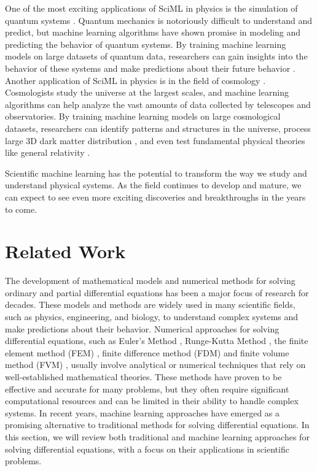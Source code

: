 One of the most exciting applications of SciML in physics is the simulation of quantum systems \cite{rupp2015machine,torlai2020machine}. Quantum mechanics is notoriously difficult to understand and predict, but machine learning algorithms have shown promise in modeling and predicting the behavior of quantum systems. By training machine learning models on large datasets of quantum data, researchers can gain insights into the behavior of these systems and make predictions about their future behavior \cite{mehta2019high}. Another application of SciML in physics is in the field of cosmology \cite{villaescusa2021camels,carleo2019machine,mathuriya2018cosmoflow}. Cosmologists study the universe at the largest scales, and machine learning algorithms can help analyze the vast amounts of data collected by telescopes and observatories. By training machine learning models on large cosmological datasets, researchers can identify patterns and structures in the universe, process large 3D dark matter distribution \cite{mathuriya2018cosmoflow}, and even test fundamental physical theories like general relativity \cite{alestas2022machine}.

Scientific machine learning has the potential to transform the way we study and understand physical systems. As the field continues to develop and mature, we can expect to see even more exciting discoveries and breakthroughs in the years to come.

\section{Related Work}
The development of mathematical models and numerical methods for solving ordinary and partial differential equations has been a major focus of research for decades. These models and methods are widely used in many scientific fields, such as physics, engineering, and biology, to understand complex systems and make predictions about their behavior. Numerical approaches for solving differential equations, such as Euler's Method \cite{euler1952methodus}, Runge-Kutta Method \cite{runge1895numerische}, the finite element method (FEM) \cite{herrmann1967finite}, finite difference method (FDM) \cite{richardson1911ix} and finite volume method (FVM) \cite{eymard2000finite}, usually involve analytical or numerical techniques that rely on well-established mathematical theories.
These methods have proven to be effective and accurate for many problems, but they often require significant computational resources and can be limited in their ability to handle complex systems. In recent years, machine learning approaches have emerged as a promising alternative to traditional methods for solving differential equations. In this section, we will review both traditional and machine learning approaches for solving differential equations, with a focus on their applications in scientific problems.

